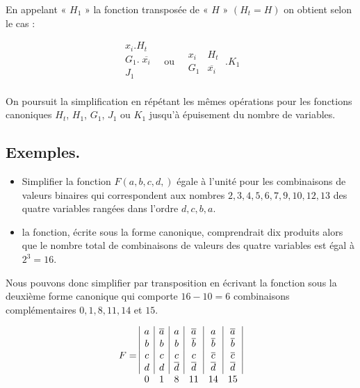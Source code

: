 En appelant « $H_1$ » la fonction transposée de « $H$ » $( H_t = H)$ on obtient selon le cas : 

\medskip

\[
\begin{array}{|c|} x_i . H_t \\ G_1 . \; \overline{x_i} \\ J_1   \\    \end{array} \quad 
      \text{ou} \quad \begin{array}{|c|c|} x_i & H_t \\ G_1 & \overline{x_i} \end{array} \; . K_1 
\]


\medskip 

On poursuit la simplification en répétant les mêmes opérations pour les fonctions canoniques $H_t$, $H_1$, $G_1$, $J_1$ ou $K_1$ jusqu'à épuisement du nombre de variables. 

\subsection{Exemples.} 
\begin{itemize}

 \item Simplifier la fonction $F(a, b, c, d,)$ égale à l'unité pour les combinaisons de valeurs binaires qui correspondent aux nombres $2, 3, 4, 5, 6, 7, 9, 10, 12, 13$ des quatre variables rangées dans l'ordre $d, c, b, a$.

\item la fonction, écrite sous la forme canonique, comprendrait dix produits alors que le nombre total de combinaisons de valeurs des quatre variables est égal à $2^3 = 16$. 


\end{itemize}

Nous pouvons donc simplifier par transposition en écrivant la fonction sous la deuxième forme canonique qui comporte $16-10=6$ combinaisons complémentaires $0, 1, 8, 11, 14$ et $15$.

\medskip

\[ F = 
\begin{array}{|c|c|c|c|c|c|}   a & \overline{a} & a &  \overline{a} & a                       &  \overline{a}  \\
                               b & b & b &  \overline{b} &  \overline{b}                      &  \overline{b}  \\
                               c & c & c & c &  \overline{c} &  \overline{c} \\
                               d & d &  \overline{d}  &  \overline{d}  &  \overline{d}  &  \overline{d} \\
\multicolumn{1}{c}{0} & \multicolumn{1}{c}{1}  & \multicolumn{1}{c}{8}   & \multicolumn{1}{c}{11}   & \multicolumn{1}{c}{14}   & \multicolumn{1}{c}{15}  \\
\end{array}
\]

